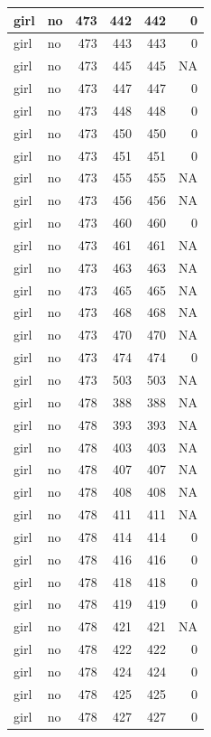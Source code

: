 \documentclass[man]{apa6}
\begin{document}
\begin{tabular}{l|l|r|r|r|r}
\hline
girl & no & 473 & 442 & 442 & 0\\
\hline
girl & no & 473 & 443 & 443 & 0\\
\hline
girl & no & 473 & 445 & 445 & NA\\
\hline
girl & no & 473 & 447 & 447 & 0\\
\hline
girl & no & 473 & 448 & 448 & 0\\
\hline
girl & no & 473 & 450 & 450 & 0\\
\hline
girl & no & 473 & 451 & 451 & 0\\
\hline
girl & no & 473 & 455 & 455 & NA\\
\hline
girl & no & 473 & 456 & 456 & NA\\
\hline
girl & no & 473 & 460 & 460 & 0\\
\hline
girl & no & 473 & 461 & 461 & NA\\
\hline
girl & no & 473 & 463 & 463 & NA\\
\hline
girl & no & 473 & 465 & 465 & NA\\
\hline
girl & no & 473 & 468 & 468 & NA\\
\hline
girl & no & 473 & 470 & 470 & NA\\
\hline
girl & no & 473 & 474 & 474 & 0\\
\hline
girl & no & 473 & 503 & 503 & NA\\
\hline
girl & no & 478 & 388 & 388 & NA\\
\hline
girl & no & 478 & 393 & 393 & NA\\
\hline
girl & no & 478 & 403 & 403 & NA\\
\hline
girl & no & 478 & 407 & 407 & NA\\
\hline
girl & no & 478 & 408 & 408 & NA\\
\hline
girl & no & 478 & 411 & 411 & NA\\
\hline
girl & no & 478 & 414 & 414 & 0\\
\hline
girl & no & 478 & 416 & 416 & 0\\
\hline
girl & no & 478 & 418 & 418 & 0\\
\hline
girl & no & 478 & 419 & 419 & 0\\
\hline
girl & no & 478 & 421 & 421 & NA\\
\hline
girl & no & 478 & 422 & 422 & 0\\
\hline
girl & no & 478 & 424 & 424 & 0\\
\hline
girl & no & 478 & 425 & 425 & 0\\
\hline
girl & no & 478 & 427 & 427 & 0\\

\end{tabular}
\end{document}
